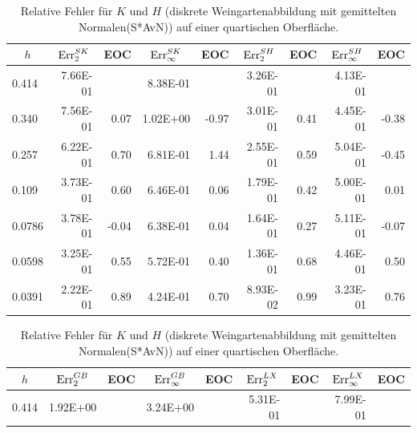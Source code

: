 \begin{table}[htbp]
      \label{tabHeineBWeingarten}
      \vspace{10pt}
    \centering
      \begin{tabular}{|l|r|r|r|r|r|r|r|r|}
      \hline
      \multicolumn{1}{|c|}{\rule{0pt}{11pt}\( h \)} & \multicolumn{1}{c|}{\( \text{Err}_{2}^{SK} \)} & \multicolumn{1}{c|}{EOC} & 
           \multicolumn{1}{c|}{\( \text{Err}_{\infty}^{SK} \)} & \multicolumn{1}{c|}{EOC} & \multicolumn{1}{c|}{\( \text{Err}_{2}^{SH} \)} &
           \multicolumn{1}{c|}{EOC} & \multicolumn{1}{c|}{\( \text{Err}_{\infty}^{SH} \)} & \multicolumn{1}{c|}{EOC} \\ \hline
           0.414 & 7.66E-01 & \multicolumn{1}{l|}{} & 8.38E-01 & \multicolumn{1}{l|}{} & 3.26E-01 & \multicolumn{1}{l|}{} & 4.13E-01 & \multicolumn{1}{l|}{} \\ \hline
            0.340 & 7.56E-01 & 0.07 & 1.02E+00 & -0.97 & 3.01E-01 & 0.41 & 4.45E-01 & -0.38 \\ \hline
            0.257 & 6.22E-01 & 0.70 & 6.81E-01 & 1.44 & 2.55E-01 & 0.59 & 5.04E-01 & -0.45 \\ \hline
            0.109 & 3.73E-01 & 0.60 & 6.46E-01 & 0.06 & 1.79E-01 & 0.42 & 5.00E-01 & 0.01 \\ \hline
            0.0786 & 3.78E-01 & -0.04 & 6.38E-01 & 0.04 & 1.64E-01 & 0.27 & 5.11E-01 & -0.07 \\ \hline
            0.0598 & 3.25E-01 & 0.55 & 5.72E-01 & 0.40 & 1.36E-01 & 0.68 & 4.46E-01 & 0.50 \\ \hline
            0.0391 & 2.22E-01 & 0.89 & 4.24E-01 & 0.70 & 8.93E-02 & 0.99 & 3.23E-01 & 0.76 \\ \hline
      \end{tabular}
      \caption[Weingarten auf der Sphäre (S*AvN)]{Relative Fehler für \( K \) und \( H \) (diskrete Weingartenabbildung mit gemittelten
      Normalen(S*AvN)) auf einer quartischen Oberfläche.}
      \label{tabHeineBWeingartenAvN}
      \vspace{10pt}
    \centering
      \begin{tabular}{|l|r|r|r|r|r|r|r|r|}
      \hline
      \multicolumn{1}{|c|}{\rule{0pt}{11pt}\( h \)} & \multicolumn{1}{c|}{\( \text{Err}_{2}^{GB} \)} & \multicolumn{1}{c|}{EOC} & 
           \multicolumn{1}{c|}{\( \text{Err}_{\infty}^{GB} \)} & \multicolumn{1}{c|}{EOC} & \multicolumn{1}{c|}{\( \text{Err}_{2}^{LX} \)} &
           \multicolumn{1}{c|}{EOC} & \multicolumn{1}{c|}{\( \text{Err}_{\infty}^{LX} \)} & \multicolumn{1}{c|}{EOC} \\ \hline
           0.414 & 1.92E+00 & \multicolumn{1}{l|}{} & 3.24E+00 & \multicolumn{1}{l|}{} & 5.31E-01 & \multicolumn{1}{l|}{} & 7.99E-01 & \multicolumn{1}{l|}{} \\ \hline

\end{tabular}
\end{table}
